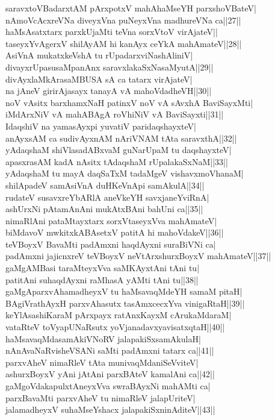 \documentclass{article}
\begin{document}
saravxtoVBadarxtAM pArxpotxV mahAhaMseYH parxshoVBateV|\\
nAmoVcAcxreVNa diveyxVna puNeyxVna madhureVNa ca||27||\\
haMsAsatxtarx parxkUjaMti teVna sorxVtoV virAjateV||\\
taseyxYvAgerxV shilAyAM hi kanAyx ceYkA mahAmateV||28||\\
AsiVnA mukatxkeVshA tu rUpadarxviNashAliniV|\\
divayxrUpasusaMpanAnx saravxlakaSxNasaMyutA||29||\\
divAyxlaMkArasaMBUSA sA ca tatarx virAjateV|\\
na jAneV girirAjasayx tanayA vA mahoVdadheVH||30||\\
noV vAsitx barxhamxNaH patinxV noV vA sAvxhA BaviSayxMti|\\
iMdArxNiV vA mahABAgA roVhiNiV vA BaviSayxti||31||\\
IdaqshiV na yamasAyxpi yuvatiV paridaqshayxteV|\\
anAyxsAM ca sudivAyxnAM nAriVNAM tAta saravxthA||32||\\
yAdaqshaM shiVlasadABxvaM guNarUpaM tu daqshayxteV|\\
apasxrasAM kadA nAsitx tAdaqshaM rUpalakaSxNaM||33||\\
yAdaqshaM tu mayA daqSaTxM tadaMgeV vishavxmoVhanaM|\\
shilApadeV samAsiVnA duHKeVnApi samAkulA||34||\\
rudateV susavxreYbARlA aneVkeYH savxjaneYviRnA|\\
ashUrxNi pAtamAnAni mukAtxBAni bahUni ca||35||\\
nimaRlAni pataMtayxtarx sorxVtaseyxVva mahAmateV|\\
biMdavoV mwkitxkABAsetxV patitA hi mahoVdakeV||36||\\
teVBoyxV BavaMti padAmxni haqdAyxni suraBiVNi ca|\\
padAmxni jajicnxreV teVBoyxV neVtArxshurxBoyxV mahAmateV||37||\\
gaMgAMBasi taraMteyxVva saMKAyxtAni tAni tu|\\
patitAni suhaqdAyxni raMhasA yAMti tAni tu||38||\\
gaMgAparxvAhamadheyxV tu haMsavaqMdeYH samaM pitaH|\\
BAgiVrathAyxH parxvAhasutx tasAmxcecxYva vinigaRtaH||39||\\
keYlAsashiKaraM pArxpayx ratAnxKayxM cArukaMdaraM|\\
vataRteV toVyapUNaRsutx yoVjanadavxyavisatxqtaH||40||\\
haMsavaqMdasamAkiVNoRV jalapakiSxsamAkulaH|\\
nAnAvaNaRvisheVSANi saMti padAmxni tatarx ca||41||\\
parxvAheV nimaRleV tAta munivaqMdaniSeVviteV|\\
ashurxBoyxV yAni jAtAni parxBAteV kamalAni ca||42||\\
gaMgoVdakapulxtAneyxVva swraBAyxNi mahAMti ca|\\
parxBavaMti parxvAheV tu nimaRleV jalapUriteV|\\
jalamadheyxV suhaMseYshacx jalapakiSxninAditeV||43||\\
\end{document}

